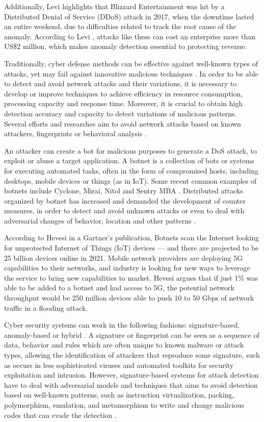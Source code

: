Additionally, Levi \cite{Levi2019} highlights that Blizzard Entertainment was hit by a Distributed Denial of Service (DDoS) attack in 2017, when the downtime lasted an entire weekend, due to difficulties related to track the root cause of the anomaly. According to Levi \cite{Levi2019}, attacks like these can cost an enterprise more than US\$2 million, which makes anomaly detection essential to protecting revenue.

Traditionally, cyber defense methods can be effective against well-known types of attacks, yet may fail against innovative malicious techniques \cite{lakhina2005mining}. In order to be able to detect and avoid network attacks and their variations, it is necessary to develop or improve techniques to achieve efficiency in resource consumption, processing capacity and response time. Moreover, it is crucial to obtain high detection accuracy and capacity to detect variations of malicious patterns. Several efforts and researches aim to avoid network attacks based on known attackers, fingerprints or behavioral analysis \cite{gu2008botminer, khattak2015botflex}. 

An attacker can create a bot for malicious purposes to generate a DoS attack, to exploit or abuse a target application. A botnet is a collection of bots or systems for executing automated tasks, often in the form of compromised hosts, including desktops, mobile devices or things (as in IoT). Some recent common examples of botnets include Cyclone, Mirai, Nitol and Sentry MBA \cite{Catucci2019}. Distributed attacks organized by botnet has increased and demanded the development of counter measures, in order to detect and avoid unknown attacks or even to deal with adversarial changes of behavior, location and other patterns \cite{wang2017botnet, Wang2018ddosbotnetssurvey}.

According to Hevesi \cite{Hevesi2019} in a Gartner's publication, Botnets scan the Internet looking for unprotected Internet of Things (IoT) devices — and there are projected to be 25 billion devices online in 2021. Mobile network providers are deploying 5G capabilities to their networks, and industry is looking for new ways to leverage the service to bring new capabilities to market. Hevesi argues that if just 1\% was able to be added to a botnet and had access to 5G, the potential network throughput would be 250 million devices able to push 10 to 50 Gbps of network traffic in a flooding attack.

Cyber security systems can work in the following fashions: signature-based, anomaly-based or hybrid \cite{mudzingwa2012study}. A signature or fingerprint can be seen as a sequence of data, behavior and rules which are often unique to known malware or attack types, allowing the identification of attackers that reproduce some signature, such as occurs in less sophisticated viruses and automated toolkits for security exploitation and intrusion. However, signature-based systems for attack detection have to deal with adversarial models and techniques that aims to avoid detection based on well-known patterns, such as instruction virtualization, packing, polymorphism, emulation, and metamorphism to write and change malicious codes that can evade the detection \cite{bhuyan2014network}.

